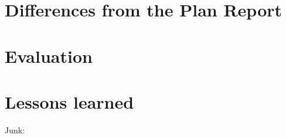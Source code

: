 \documentclass[10pt,sigplan,screen,nonacm]{acmart}
\begin{document}
\section{Differences from the Plan Report}

\section{Evaluation}

\section{Lessons learned}


Junk: \cite{felleisen:1988:the}







\newpage

\appendix
\onecolumn
\end{document}
